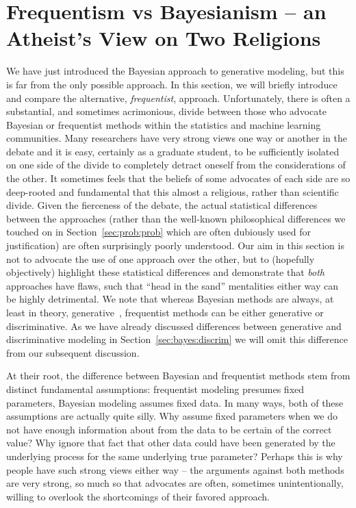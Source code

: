 
\section{Frequentism vs Bayesianism -- an Atheist's View on Two Religions}
\label{sec:bayes:religions}

We have just introduced the Bayesian approach to generative modeling, but this is far from
the only possible approach.  In this section, we will briefly introduce and compare the alternative, \emph{frequentist},
approach.
  Unfortunately, there is often a substantial, and sometimes acrimonious, divide between those
who advocate Bayesian or frequentist methods within the statistics and machine learning communities.  Many researchers
have very strong views one way or another in the debate and it is easy, certainly as a graduate student,
to be sufficiently isolated on one side of the divide to completely detract oneself from the considerations of the
other.  It sometimes feels that the beliefs of some advocates of each side are so deep-rooted and 
fundamental that this almost a religious, rather than scientific divide.  Given the fierceness of the debate,
the actual statistical differences between the approaches (rather than the well-known philosophical differences we touched
on in Section~\ref{sec:prob:prob} which are often dubiously used for justification) are often surprisingly poorly understood.
Our aim in this section is not to advocate the use of one approach over the other, but to (hopefully objectively)
highlight these statistical differences and demonstrate that \emph{both} approaches have flaws, such that ``head in the sand''
mentalities either way can be highly detrimental.  
We note that whereas Bayesian methods are always, at least in theory, generative~\citep[Section~14.1]{gelman2014bayesian},
frequentist methods can be either generative or discriminative. 
As we have already discussed differences between generative and
discriminative modeling in Section~\ref{sec:bayes:discrim} we will omit this difference from our subsequent discussion.

At their root, the difference between Bayesian and frequentist methods stem from distinct fundamental
assumptions: frequentist modeling presumes fixed parameters, Bayesian modeling assumes fixed data.  In many ways,
both of these assumptions are actually quite silly. Why assume fixed parameters when we do not have enough
information about from the data to be certain of the correct value?  Why ignore that fact that other data could have 
been generated by the underlying process for the same underlying true parameter?  Perhaps this is why people have
such strong views either way -- the arguments against both methods are very strong, so much so that advocates are
often, sometimes unintentionally, willing to overlook the shortcomings of their favored approach.  

